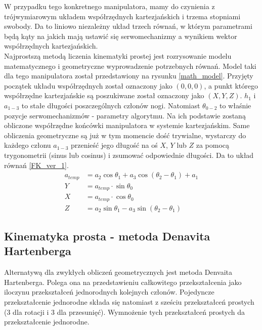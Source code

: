 W przypadku tego konkretnego manipulatora, mamy do czynienia z trójwymiarowym układem współrzędnych kartezjańskich i trzema stopniami swobody. Da to liniowo niezależny układ trzech równań, w którym parametrami będą kąty na jakich mają ustawić się serwomechanizmy a wynikiem wektor współrzędnych kartezjańskich.\\

Najprostszą metodą liczenia kinematyki prostej jest rozrysowanie modelu matematycznego i geometryczne wyprowadzenie potrzebnych równań. Model taki dla tego manipulatora został przedstawiony na rysunku \ref{math_model}. Przyjęty początek układu współrzędnych został oznaczony jako $(0, 0, 0)$, a punkt którego współrzędne kartezjańskie są poszukiwane został oznaczony jako $(X, Y, Z)$. $h_1$ i $a_{1-3}$ to stałe długości poszczególnych członów nogi. Natomiast $\theta_{0-2}$ to właśnie pozycje serwomechanizmów - parametry algorytmu. Na ich podstawie zostaną obliczone współrzędne końcówki manipulatora w systemie kartezjańskim. Same obliczenia geometryczne są już w tym momencie dość trywialne, wystarczy do każdego członu $a_{1-3}$ przenieść jego długość na oś $X$, $Y$ lub $Z$ za pomocą trygonometrii (sinus lub cosinus) i zsumować odpowiednie długości. Da to układ równań \ref{FK_ver_1}.\\

\begin{equation} \label{FK_ver_1}
\begin{split}
a_{temp} &= a_2 \cos{\theta_1} + a_3 \cos{\left(\theta_2 - \theta_1\right)} + a_1\\
Y &= a_{temp} \cdot \sin{\theta_0}\\
X &= a_{temp} \cdot \cos{\theta_0}\\
Z &= a_2 \sin{\theta_1} - a_3 \sin{\left(\theta_2 - \theta_1\right)}
\end{split}
\end{equation}

\subsection{Kinematyka prosta - metoda Denavita Hartenberga \cite{DH_AA_article}}
Alternatywą dla zwykłych obliczeń geometrycznych jest metoda Denvaita Hartenberga. Polega ona na przedstawieniu całkowitego przekształcenia jako iloczynu przekształceń jednorodnych kolejnych członów. Pojedyncze przekształcenie jednorodne składa się natomiast z sześciu przekształceń prostych (3 dla rotacji i 3 dla przesunięć). Wymnożenie tych przekształceń prostych da przekształcenie jednorodne. \cite{DH_wpaszke_wyklad}\\

